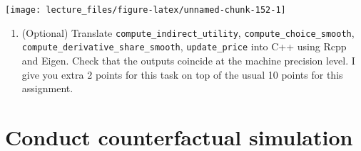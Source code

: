 \documentclass[
]{book}
\newenvironment{Shaded}{\begin{snugshade}}{\end{snugshade}}
\newcommand{\AttributeTok}[1]{\textcolor[rgb]{0.77,0.63,0.00}{#1}}
\newcommand{\CommentTok}[1]{\textcolor[rgb]{0.56,0.35,0.01}{\textit{#1}}}
\newcommand{\DecValTok}[1]{\textcolor[rgb]{0.00,0.00,0.81}{#1}}
\newcommand{\FunctionTok}[1]{\textcolor[rgb]{0.00,0.00,0.00}{#1}}
\newcommand{\NormalTok}[1]{#1}
\newcommand{\OtherTok}[1]{\textcolor[rgb]{0.56,0.35,0.01}{#1}}
\newcommand{\SpecialCharTok}[1]{\textcolor[rgb]{0.00,0.00,0.00}{#1}}
\newcommand{\StringTok}[1]{\textcolor[rgb]{0.31,0.60,0.02}{#1}}
\providecommand{\tightlist}{%
  \setlength{\itemsep}{0pt}\setlength{\parskip}{0pt}}
\begin{document}
\begin{Shaded}
\end{Shaded}

\begin{center}\texttt{[image: lecture\_files/figure-latex/unnamed-chunk-152-1]} \end{center}

\begin{enumerate}
\def\labelenumi{\arabic{enumi}.}
\setcounter{enumi}{1}
\tightlist
\item
  (Optional) Translate \texttt{compute\_indirect\_utility}, \texttt{compute\_choice\_smooth}, \texttt{compute\_derivative\_share\_smooth}, \texttt{update\_price} into C++ using Rcpp and Eigen. Check that the outputs coincide at the machine precision level. I give you extra 2 points for this task on top of the usual 10 points for this assignment.
\end{enumerate}

\hypertarget{conduct-counterfactual-simulation}{%
\section{Conduct counterfactual simulation}\label{conduct-counterfactual-simulation}}
\end{document}

